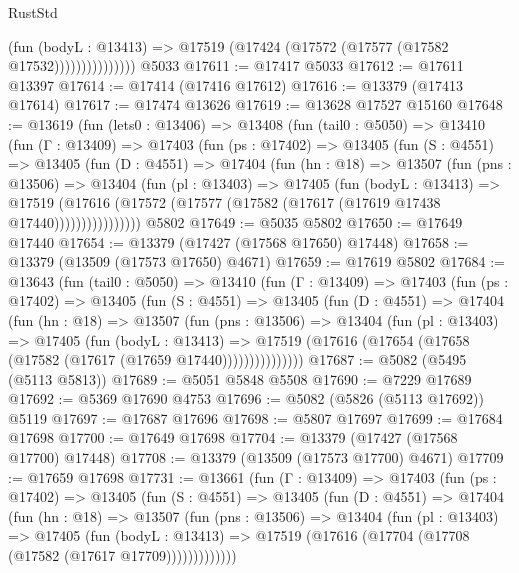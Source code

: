 \begin{lexlean}{RustStd}
\begin{coremodule}
                        (fun (bodyL : @13413) =>
                        @17519 (@17424 (@17572 (@17577 (@17582 @17532)))))))))))))))
    @5033
@17611 := @17417 @5033
@17612 := @17611 @13397
@17614 := @17414 (@17416 @17612)
@17616 := @13379 (@17413 @17614)
@17617 := @17474 @13626
@17619 := @13628 @17527 @15160
@17648 := @13619
    (fun (lets0 : @13406) =>
    @13408
      (fun (tail0 : @5050) =>
      @13410
        (fun (Γ : @13409) =>
        @17403
          (fun (ps : @17402) =>
          @13405
            (fun (S : @4551) =>
            @13405
              (fun (D : @4551) =>
              @17404
                (fun (hn : @18) =>
                @13507
                  (fun (pns : @13506) =>
                  @13404
                    (fun (pl : @13403) =>
                    @17405
                      (fun (bodyL : @13413) =>
                      @17519
                        (@17616
                          (@17572 (@17577 (@17582 (@17617 (@17619 @17438 @17440))))))))))))))))
    @5802
@17649 := @5035 @5802
@17650 := @17649 @17440
@17654 := @13379 (@17427 (@17568 @17650) @17448)
@17658 := @13379 (@13509 (@17573 @17650) @4671)
@17659 := @17619 @5802
@17684 := @13643
    (fun (tail0 : @5050) =>
    @13410
      (fun (Γ : @13409) =>
      @17403
        (fun (ps : @17402) =>
        @13405
          (fun (S : @4551) =>
          @13405
            (fun (D : @4551) =>
            @17404
              (fun (hn : @18) =>
              @13507
                (fun (pns : @13506) =>
                @13404
                  (fun (pl : @13403) =>
                  @17405
                    (fun (bodyL : @13413) =>
                    @17519 (@17616 (@17654 (@17658 (@17582 (@17617 (@17659 @17440)))))))))))))))
@17687 := @5082 (@5495 (@5113 @5813))
@17689 := @5051 @5848 @5508
@17690 := @7229 @17689
@17692 := @5369 @17690 @4753
@17696 := @5082 (@5826 (@5113 @17692)) @5119
@17697 := @17687 @17696
@17698 := @5807 @17697
@17699 := @17684 @17698
@17700 := @17649 @17698
@17704 := @13379 (@17427 (@17568 @17700) @17448)
@17708 := @13379 (@13509 (@17573 @17700) @4671)
@17709 := @17659 @17698
@17731 := @13661
    (fun (Γ : @13409) =>
    @17403
      (fun (ps : @17402) =>
      @13405
        (fun (S : @4551) =>
        @13405
          (fun (D : @4551) =>
          @17404
            (fun (hn : @18) =>
            @13507
              (fun (pns : @13506) =>
              @13404
                (fun (pl : @13403) =>
                @17405
                  (fun (bodyL : @13413) =>
                  @17519 (@17616 (@17704 (@17708 (@17582 (@17617 @17709)))))))))))))

\end{coremodule}
\end{lexlean}
